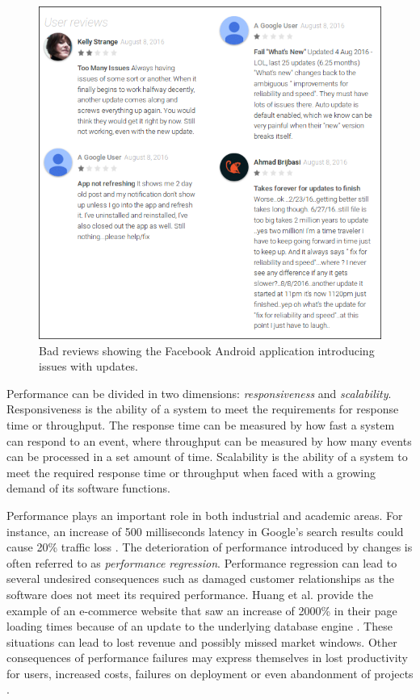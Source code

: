 \begin{figure}[h]
	\centering
	\includegraphics[width=\linewidth]{introduction/images/bad_reviews.png}
	\caption{Bad reviews showing the Facebook Android application introducing issues with updates.}
	\label{fig:facebook_bad_reviews}
\end{figure}

Performance can be divided in two dimensions: \emph{responsiveness} and \emph{scalability}.
Responsiveness is the ability of a system to meet the requirements for response time or throughput.
The response time can be measured by how fast a system can respond to an event, where throughput can be measured by how many events can be processed in a set amount of time.
Scalability is the ability of a system to meet the required response time or throughput when faced with a growing demand of its software functions.

Performance plays an important role in both industrial and academic areas.
For instance, an increase of 500 milliseconds latency in Google's search results could cause 20\% traffic loss \cite{mayer2009search}.  
The deterioration of performance introduced by changes is often referred to as \emph{performance regression}.
Performance regression can lead to several undesired consequences such as damaged customer relationships as the software does not meet its required performance.
Huang et al. provide the example of an e-commerce website that saw an increase of 2000\% in their page loading times because of an update to the underlying database engine \cite{huang2014performance}.
These situations can lead to lost revenue and possibly missed market windows.
Other consequences of performance failures may express themselves in lost productivity for users, increased costs, failures on deployment or even abandonment of projects \cite{woodside2007future, williams1998performance}.

